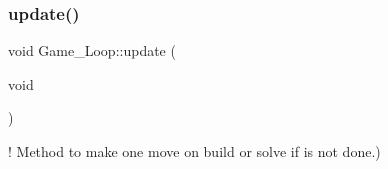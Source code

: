\mbox{\label{classGame__Loop_a549ad971281e15afa38a5dc204843891}} 
\subsubsection{\texorpdfstring{update()}{update()}}
{\footnotesize\ttfamily void Game\+\_\+\+Loop\+::update (\begin{DoxyParamCaption}\item[{void}]{ }\end{DoxyParamCaption})}



! Method to make one move on build or solve if is not done.) 


